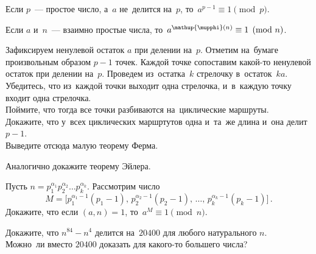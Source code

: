 


\begingroup
    \ifdefined\mathup
        \providecommand\eulerphi{\mathup{\mupphi}}\fi
    \ifdefined\upphi
        \providecommand\eulerphi{\upphi}\fi
    \providecommand\eulerphi{\phi}%

Если $p$~--- простое число, а~$a$ не~делится на~$p$,
то~$a^{p-1} \equiv 1 \pmod{p}$.

Если $a$ и~$n$~--- взаимно простые числа,
то~$a^{\eulerphi(n)} \equiv 1 \pmod n$.

\begin{problems}

\item
Зафиксируем ненулевой остаток $a$ при делении на~$p$.
Отметим на~бумаге произвольным образом $p - 1$ точек.
Каждой точке сопоставим какой-то ненулевой остаток при делении на~$p$.
Проведем из~остатка~$k$ стрелочку в~остаток~$ka$.
\\
\subproblem
Убедитесь, что из~каждой точки выходит одна стрелочка, и~в~каждую точку входит
одна стрелочка.
\\
\subproblem
Поймите, что тогда все точки разбиваются на~циклические маршруты.
\\
\subproblem
Докажите, что у~всех циклических маршртутов одна и~та~же длина и~она делит
$p - 1$.
\\
\subproblem
Выведите отсюда малую теорему Ферма.

\item
Аналогично докажите теорему Эйлера.

\item
Пусть
\( n = p_{1}^{\alpha_{1}} p_{2}^{\alpha_{2}} \ldots p_{k}^{\alpha_{k}} \).
Рассмотрим число
\[
    M
=
    \bigl[
        p_{1}^{\alpha_{1} - 1} (p_{1} - 1)
    , \,
        p_{2}^{\alpha_{2} - 1} (p_{2} - 1)
    , \, \ldots , \,
        p_{k}^{\alpha_{k} - 1} (p_{k} - 1)
    \bigr]
\, . \]
Докажите, что если $(a, n) = 1$, то~$a^{M} \equiv 1 \pmod{n}$.

\item
\subproblem
Докажите, что $n^{84} - n^{4}$ делится на~$20400$ для любого натурального $n$.
\\
\subproblem
Можно~ли вместо $20400$ доказать для какого-то большего числа?

\end{problems}

